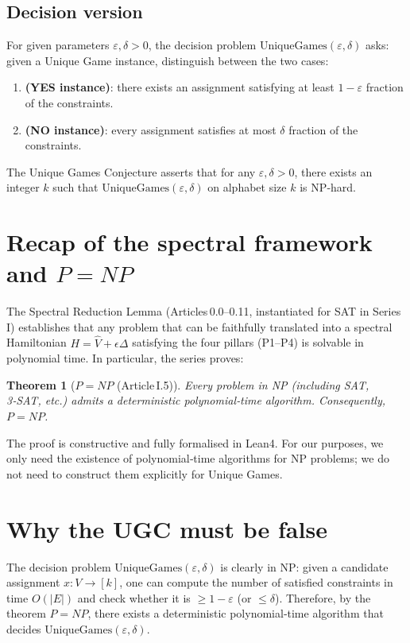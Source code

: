 \documentclass[11pt,a4paper]{article}
\newtheorem{theorem}{Theorem}[section]
\begin{document}
\subsection{Decision version}
For given parameters $\varepsilon,\delta>0$, the decision problem $\text{UniqueGames}(\varepsilon,\delta)$ asks: given a Unique Game instance, distinguish between the two cases:
\begin{enumerate}
\item \textbf{(YES instance)}: there exists an assignment satisfying at least $1-\varepsilon$ fraction of the constraints.
\item \textbf{(NO instance)}: every assignment satisfies at most $\delta$ fraction of the constraints.
\end{enumerate}
The Unique Games Conjecture asserts that for any $\varepsilon,\delta>0$, there exists an integer $k$ such that $\text{UniqueGames}(\varepsilon,\delta)$ on alphabet size $k$ is NP‑hard.

\section{Recap of the spectral framework and $P = NP$}

The Spectral Reduction Lemma (Articles 0.0–0.11, instantiated for SAT in Series I) establishes that any problem that can be faithfully translated into a spectral Hamiltonian $H = \hat{V} + \epsilon\Delta$ satisfying the four pillars (P1–P4) is solvable in polynomial time. In particular, the series proves:

\begin{theorem}[$P = NP$ (Article I.5)]
Every problem in NP (including SAT, 3‑SAT, etc.) admits a deterministic polynomial‑time algorithm. Consequently, $P = NP$.
\end{theorem}

The proof is constructive and fully formalised in Lean4. For our purposes, we only need the existence of polynomial‑time algorithms for NP problems; we do not need to construct them explicitly for Unique Games.

\section{Why the UGC must be false}

The decision problem $\text{UniqueGames}(\varepsilon,\delta)$ is clearly in NP: given a candidate assignment $x: V\to[k]$, one can compute the number of satisfied constraints in time $O(|E|)$ and check whether it is $\ge 1-\varepsilon$ (or $\le \delta$). Therefore, by the theorem $P = NP$, there exists a deterministic polynomial‑time algorithm that decides $\text{UniqueGames}(\varepsilon,\delta)$.
\end{document}
